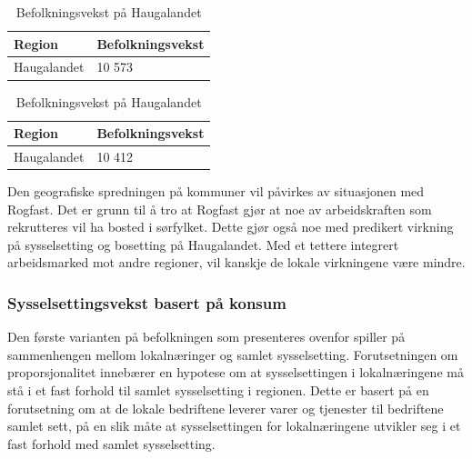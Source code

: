 \documentclass[
]{article}
\begin{document}
\begin{table}

\caption{\label{tbl-fysisk}Befolkningsvekst på
Haugalandet}\begin{minipage}[t]{0.50\linewidth}

{\centering 

\begin{tabular}[t]{ll}
\toprule
Region & Befolkningsvekst\\
\midrule
Haugalandet & 10 573\\
\bottomrule
\end{tabular}

}

\end{minipage}%
%
\begin{minipage}[t]{0.50\linewidth}

{\centering 

\begin{tabular}[t]{ll}
\toprule
Region & Befolkningsvekst\\
\midrule
Haugalandet & 10 412\\
\bottomrule
\end{tabular}

}

\end{minipage}%

\end{table}

Den geografiske spredningen på kommuner vil påvirkes av situasjonen med
Rogfast. Det er grunn til å tro at Rogfast gjør at noe av arbeidskraften
som rekrutteres vil ha bosted i sørfylket. Dette gjør også noe med
predikert virkning på sysselsetting og bosetting på Haugalandet. Med et
tettere integrert arbeidsmarked mot andre regioner, vil kanskje de
lokale virkningene være mindre.

\hypertarget{sysselsettingsvekst-basert-puxe5-konsum}{%
\subsubsection{Sysselsettingsvekst basert på
konsum}\label{sysselsettingsvekst-basert-puxe5-konsum}}

Den første varianten på befolkningen som presenteres ovenfor spiller på
sammenhengen mellom lokalnæringer og samlet sysselsetting.
Forutsetningen om proporsjonalitet innebærer en hypotese om at
sysselsettingen i lokalnæringene må stå i et fast forhold til samlet
sysselsetting i regionen. Dette er basert på en forutsetning om at de
lokale bedriftene leverer varer og tjenester til bedriftene samlet sett,
på en slik måte at sysselsettingen for lokalnæringene utvikler seg i et
fast forhold med samlet sysselsetting.
\end{document}
